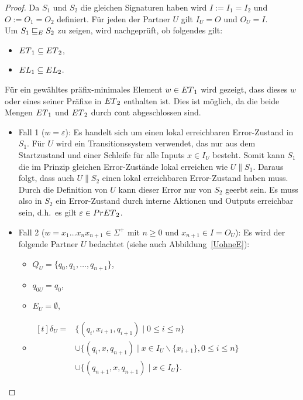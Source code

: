\begin{proof}
  Da $S_1$ und $S_2$ die gleichen Signaturen haben wird
  $I:=I_1=I_2$ und $O:=O_1=O_2$ definiert. Für jeden der Partner $U$ gilt $I_U=O$ und
  $O_U=I$.\\
  Um $S_1\ERel S_2$ zu zeigen, wird nachgeprüft, ob folgendes gilt:
  \begin{itemize}
    \item $\ET{}_1\subseteq \ET{}_2$,
    \item $\EL{}_1\subseteq \EL{}_2$.
  \end{itemize}
  Für ein gewähltes präfix-minimales Element $w\in \ET{}_1$ wird gezeigt,
  dass dieses $w$ oder eines seiner Präfixe in $\ET{}_2$ enthalten ist.
  Dies ist möglich, da die beide Mengen $\ET{}_1$ und $\ET{}_2$ durch $\cont{}$
  abgeschlossen sind.
  \begin{itemize}
    \item Fall 1 ($w=\varepsilon$): Es handelt sich um einen lokal erreichbaren
      Error-Zustand in $S_1$.
      Für $U$ wird ein Transitionssystem verwendet, das nur aus dem Startzustand und
      einer Schleife für alle Inputs $x\in I_U$ besteht. Somit kann $S_1$ die
      im Prinzip gleichen
      Error-Zustände lokal erreichen wie $U\|S_1$. Daraus folgt, dass auch
      $U\|S_2$ einen lokal erreichbaren Error-Zustand haben muss. Durch die
      Definition von $U$ kann dieser Error nur von $S_2$ geerbt sein. Es
      muss also in $S_2$ ein Error-Zustand durch interne Aktionen und Outputs
      erreichbar sein, d.h.\ es gilt $\varepsilon\in \PrET{}_2$.
    \item Fall 2 ($w=x_1\dots x_n x_{n+1}\in\Sigma ^+$ mit $n\geq 0$ und
      $x_{n+1}\in I = O_U$): Es wird der folgende Partner $U$ bedachtet (siehe auch
      Abbildung~\ref{UohneE}):
      \begin{itemize}
        \item $Q_U=\{q_0,q_1,\dots ,q_{n+1}\}$,
        \item $q_{0U}=q_0$,
        \item $E_U=\emptyset$,
        \item $\begin{aligned}[t]
            \delta _U=&\{(q_i,x_{i+1},q_{i+1})\mid  0\leq i\leq n\}\\
                      &\cup\{(q_i,x,q_{n+1})\mid  x\in I_U\backslash\{x_{i+1}\},
          0\leq i\leq n\}\\
          &\cup\{(q_{n+1},x,q_{n+1})\mid  x\in I_U\}.
        \end{aligned}$
      \end{itemize}
      \begin{figure} [h!tbp]
      \begin{center}
        \begin{tikzpicture}[->, >=latex',auto,node distance =3cm, semithick]


\end{tikzpicture}
\end{center}
\end{figure}
\end{itemize}
\end{proof}
